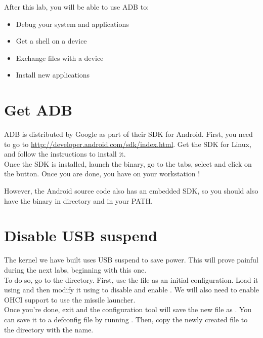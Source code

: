 
After this lab, you will be able to use ADB to:
\begin{itemize}
  \item Debug your system and applications
  \item Get a shell on a device
  \item Exchange files with a device
  \item Install new applications
\end{itemize}

\section{Get ADB}

ADB is distributed by Google as part of their SDK for Android. First,
you need to go to
\url{http://developer.android.com/sdk/index.html}. Get the SDK for
Linux, and follow the instructions to install it.\\

Once the SDK is installed, launch the  binary, go to the
 tabs, select  and
click on the  button. Once you are done, you have  on
your workstation !

However, the Android source code also has an embedded SDK, so you
should also have the  binary in 
directory and in your PATH.

\section{Disable USB suspend}

The kernel we have built uses USB suspend to save power. This will
prove painful during the next labs, beginning with this one.\\

To do so, go to the  directory. First, use the
 file as an initial configuration. Load it using
 and then modify it using
 to disable 
and enable . We will also need to enable
OHCI support to use the missile launcher.\\

Once you're done, exit and the configuration tool will save the new
file as . You can save it to a defconfig file by
running . Then, copy the newly created
 file to the  directory with
the  name.\\


